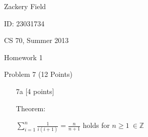 \documentclass[11pt,letterpaper]{article}
\begin{document}
Zackery Field

ID: 23031734

CS 70, Summer 2013

Homework 1 

Problem 7 (12 Points)
\bigskip

\begin{enumerate}

\item[7a] [4 points] 

Theorem:

$\sum\limits_{i=1}^{n} \frac{1}{i(i+1)} = \frac{n}{n+1}$ holds for $n \geq 1 \: \in \mathbb{Z} $

\end{enumerate}
\end{document}
